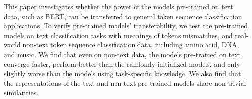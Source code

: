 This paper investigates whether the power of the models pre-trained on text data, such as BERT, can be transferred to general token sequence classification applications. To verify pre-trained models' transferability, we test the pre-trained models on text classification tasks with meanings of tokens mismatches, and real-world non-text token sequence classification data, including amino acid, DNA, and music. We find that even on non-text data, the models pre-trained on text converge faster, perform better than the randomly initialized models, and only slightly worse than the models using task-specific knowledge. We also find that the representations of the text and non-text pre-trained models share non-trivial similarities.
